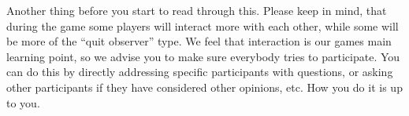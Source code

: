 \begin{hint}
    Another thing before you start to read through this.
    Please keep in mind, that during the game some players will interact more with each other, while some will be more of the \enquote{quit observer} type.
    We feel that interaction is our games main learning point, so we advise you to make sure everybody tries to participate.
    You can do this by directly addressing specific participants with questions, or asking other participants if they have considered other opinions, etc.
    How you do it is up to you.
\end{hint}